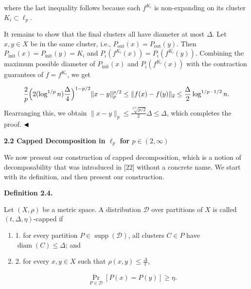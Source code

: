 where the last inequality follows because each $f^{K_{i}}$ is non-expanding on its cluster $K_{i}\subset\ell_{p}$.
\par
\par
It remains to show that the final clusters all have diameter at most $\Delta$. Let $x,y\in X$ be in the same cluster, i.e., $P_{\text{out}}(x)=P_{\text{out}}(y)$. Then $P_{\text{init}}(x)=P_{\text{init}}(y)=K_{i}$ and $P_{i}(f^{K_{i}}(x))=P_{i}(f^{K_{i}}(y))$. Combining the maximum possible diameter of $P_{\text{init}}(x)$ and $P_{i}(f^{K_{i}}(x))$ with the contraction guarantees of $f=f^{K_{i}}$, we get
\par
\[\begin{aligned}
\frac{2}{p}\Big{(}2(\log^{1/p}{n})\frac{\Delta}{4}\Big{)}^{1-p/2}\|x-y\|_{p}^{%
p/2}\leq\|f(x)-f(y)\|_{2}\leq\frac{\Delta}{2}\log^{1/p-1/2}{n}.
\end{aligned}\]
Rearranging this, we obtain $\|x-y\|_{p}\leq\frac{\sqrt[p/2]{p/2}}{2}\Delta\leq\Delta$, which completes the proof. $\hfill\blacktriangleleft$
\par
\par
\par
\par
\par\medskip\noindent\textbf{2.2 Capped Decomposition in $\ell_{p}$ for $p\in(2,\infty)$}\par
We now present our construction of capped decomposition, which is a notion of decomposability that was introduced in [22] without a concrete name. We start with its definition, and then present our construction.
\par
\par
\par\medskip\noindent\textbf{Definition 2.4.}\par
Let $(X,\rho)$ be a metric space. A distribution $\mathcal{D}$ over partitions of $X$ is called $(t,\Delta,\eta)$-capped if
\par
\begin{enumerate}
\item[]  1. 
for every partition $P\in\operatorname{supp}(\mathcal{D})$, all clusters $C\in P$ have $\operatorname{diam}(C)\leq\Delta$; and
\par
\par
\item[]  2. 
for every $x,y\in X$ such that $\rho(x,y)\leq\frac{\Delta}{t}$,
\par
\[\begin{aligned}
\Pr_{P\in\mathcal{D}}[P(x)=P(y)]\geq\eta.
\end{aligned}\]
\par
\end{enumerate}
